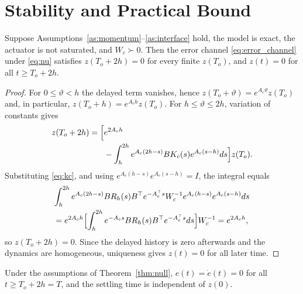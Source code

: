 \section{Stability and Practical Bound}\label{sec:stability}

\begin{theorem}\label{thm:null}
Suppose Assumptions~\ref{as:momentum}--\ref{as:interface} hold, the model is
exact, the actuator is not saturated, and $W_c\succ0$. Then the error channel
\eqref{eq:error_channel} under \eqref{eq:nu} satisfies
$z(T_o+2h)=0$ for every finite $z(T_o)$, and $z(t)=0$ for all
$t\ge T_o+2h$.
\end{theorem}

\begin{proof}
For $0\le\vartheta<h$ the delayed term vanishes, hence
$z(T_o+\vartheta)=e^{A_c\vartheta}z(T_o)$ and, in particular,
$z(T_o+h)=e^{A_ch}z(T_o)$. For $h\le\vartheta\le2h$, variation of constants
gives
\begin{equation}
\begin{aligned}
 z(T_o+2h)=\Bigl[&e^{2A_ch}\\
 &-\int_h^{2h}e^{A_c(2h-s)}BK_c(s)e^{A_c(s-h)}ds\Bigr]z(T_o).
\end{aligned}
 \label{eq:voc}
\end{equation}
Substituting \eqref{eq:kc}, and using $e^{A_c(h-s)}e^{A_c(s-h)}=I$, the
integral equals
\begin{multline}
 \int_h^{2h}e^{A_c(2h-s)}BR_h(s)B^\top e^{-A_c^\top s}
 W_c^{-1}e^{A_c(h-s)}e^{A_c(s-h)}ds\\
 =e^{2A_ch}\Bigl[\int_h^{2h}e^{-A_cs}BR_h(s)B^\top e^{-A_c^\top s}ds\Bigr]W_c^{-1}
 =e^{2A_ch},
\end{multline}
so $z(T_o+2h)=0$. Since the delayed history is zero afterwards and the
dynamics are homogeneous, uniqueness gives $z(t)=0$ for all later time.
\end{proof}

\begin{corollary}\label{cor:exact}
Under the assumptions of Theorem~\ref{thm:null}, $e(t)=\dot e(t)=0$ for all
$t\ge T_o+2h=T$, and the settling time is independent of $z(0)$.
\end{corollary}

